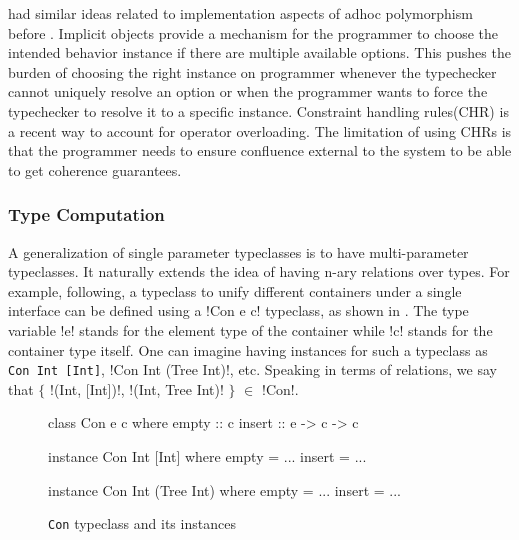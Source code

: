 \documentclass[screen,nonacm]{acmart}
\begin{document}
\citet{kaes_parametric_1988} had similar ideas related to implementation aspects of adhoc
polymorphism before \citet{wadler_polymorphism_1989}. Implicit
objects\cite{oliveira_typeclasses_2010} provide a mechanism for the programmer to choose
the intended behavior instance if there are multiple available options. This pushes the
burden of choosing the right instance on programmer whenever the typechecker cannot
uniquely resolve an option or when the programmer wants to force the typechecker to
resolve it to a specific instance. Constraint handling
rules(CHR)\cite{fruhwirth_theory_1998, stuckey_theory_2005} is a recent way to account for
operator overloading. The limitation of using CHRs is that the programmer needs to ensure
confluence external to the system to be able to get coherence guarantees.


\subsubsection{Type Computation}
A generalization of single parameter typeclasses is to have multi-parameter
typeclasses. It naturally extends the idea of having n-ary relations over types. For
example, following\cite{jones_tcfd_2000}, a typeclass to unify different containers under
a single interface can be defined using a !Con e c! typeclass, as shown in
. The type variable !e! stands for the element type of the
container while !c! stands for the container type itself. One can imagine having instances
for such a typeclass as \lstinline{Con Int [Int]}, !Con Int (Tree Int)!, etc. Speaking in
terms of relations, we say that $\{$ !(Int, [Int])!, !(Int, Tree Int)! $\}$ $\in$ !Con!.


\begin{figure}[ht]
\centering
\begin{minipage}[ht]{0.3\linewidth}
\begin{code}
class Con e c where
  empty :: c
  insert :: e -> c -> c
\end{code}
\end{minipage}%
\begin{minipage}[ht]{0.3\linewidth}
\begin{code}
instance Con Int [Int] where
  empty = ...
  insert = ...
\end{code}
\end{minipage}%
\begin{minipage}[ht]{0.3\linewidth}
\begin{code}
instance Con Int (Tree Int) where
  empty = ...
  insert = ...
\end{code}
\end{minipage}
\caption[\lstinline{Con} typeclass]{\lstinline{Con} typeclass and its instances}
\label{fig:tc-collection}
\end{figure}
\end{document}
